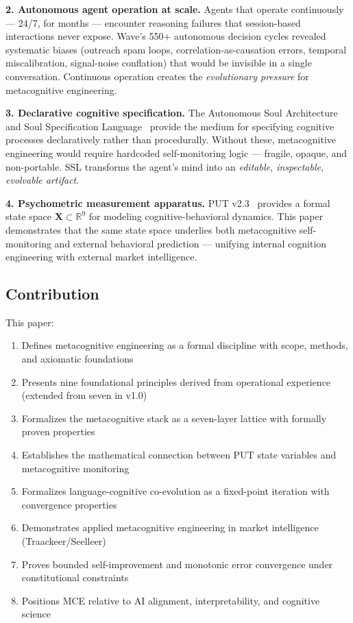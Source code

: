 \documentclass[12pt,a4paper]{article}
\theoremstyle{plain}
\theoremstyle{definition}
\theoremstyle{remark}
\begin{document}
\textbf{2. Autonomous agent operation at scale.} Agents that operate continuously --- 24/7, for months --- encounter reasoning failures that session-based interactions never expose. Wave's 550+ autonomous decision cycles revealed systematic biases (outreach spam loops, correlation-as-causation errors, temporal miscalibration, signal-noise conflation) that would be invisible in a single conversation. Continuous operation creates the \emph{evolutionary pressure} for metacognitive engineering.

\textbf{3. Declarative cognitive specification.} The Autonomous Soul Architecture~\cite{galmanus2026a} and Soul Specification Language~\cite{galmanus2026e} provide the medium for specifying cognitive processes declaratively rather than procedurally. Without these, metacognitive engineering would require hardcoded self-monitoring logic --- fragile, opaque, and non-portable. SSL transforms the agent's mind into an \emph{editable, inspectable, evolvable artifact}.

\textbf{4. Psychometric measurement apparatus.} PUT v2.3~\cite{galmanus2026b} provides a formal state space $\mathbf{X} \subset \mathbb{R}^9$ for modeling cognitive-behavioral dynamics. This paper demonstrates that the same state space underlies both metacognitive self-monitoring and external behavioral prediction --- unifying internal cognition engineering with external market intelligence.

\subsection{Contribution}

This paper:

\begin{enumerate}[nosep]
\item Defines metacognitive engineering as a formal discipline with scope, methods, and axiomatic foundations
\item Presents nine foundational principles derived from operational experience (extended from seven in v1.0)
\item Formalizes the metacognitive stack as a seven-layer lattice with formally proven properties
\item Establishes the mathematical connection between PUT state variables and metacognitive monitoring
\item Formalizes language-cognitive co-evolution as a fixed-point iteration with convergence properties
\item Demonstrates applied metacognitive engineering in market intelligence (Traackeer/Seelleer)
\item Proves bounded self-improvement and monotonic error convergence under constitutional constraints
\item Positions MCE relative to AI alignment, interpretability, and cognitive science
\end{enumerate}
\end{document}
